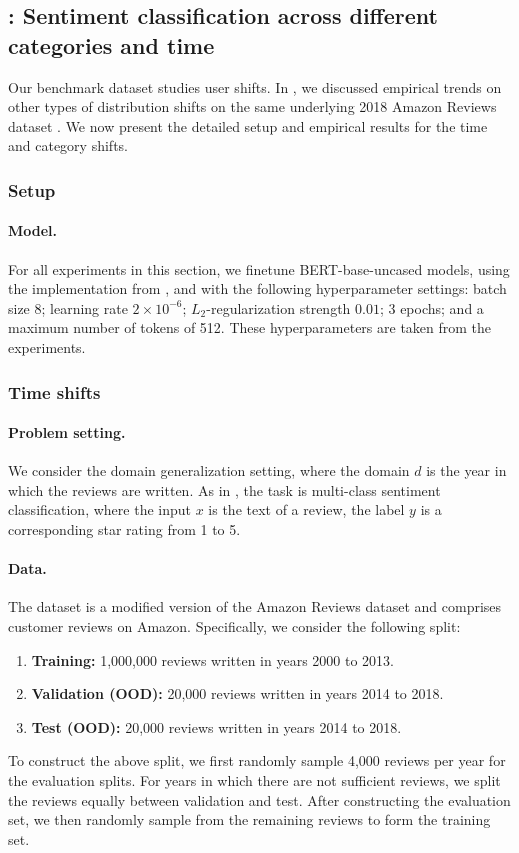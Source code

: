 \subsection{\AmazonName{}: Sentiment classification across different categories and time}\label{sec:app_amazon_other}

Our benchmark dataset \Amazon studies user shifts.
In , we discussed empirical trends on other types of distribution shifts on the same underlying 2018 Amazon Reviews dataset \citep{ni2019justifying}.
We now present the detailed setup and empirical results for the time and category shifts.

\subsubsection{Setup}
\paragraph{Model.}
For all experiments in this section, we finetune BERT-base-uncased models, using the implementation from \citet{wolf2019transformers}, and with the following hyperparameter settings:
batch size 8; learning rate $2 \times 10^{-6}$; $L_2$-regularization strength $0.01$; 3 epochs; and a maximum number of tokens of 512.
These hyperparameters are taken from the \Amazon experiments.


\subsubsection{Time shifts}
\paragraph{Problem setting.}
We consider the domain generalization setting, where the domain $d$ is the year in which the reviews are written.
As in \Amazon, the task is multi-class sentiment classification, where
the input $x$ is the text of a review, the label $y$ is a corresponding star rating from 1 to 5.

\paragraph{Data.}
The dataset is a modified version of the Amazon Reviews dataset \citep{ni2019justifying} and comprises customer reviews on Amazon.
Specifically, we consider the following split:
\begin{enumerate}
  \item \textbf{Training:} 1,000,000 reviews written in years 2000 to 2013.
  \item \textbf{Validation (OOD):} 20,000 reviews written in years 2014 to 2018.
  \item \textbf{Test (OOD):} 20,000 reviews written in years 2014 to 2018.
\end{enumerate}
To construct the above split, we first randomly sample 4,000 reviews per year for the evaluation splits. For years in which there are not sufficient reviews, we split the reviews equally between validation and test. After constructing the evaluation set, we then randomly sample from the remaining reviews to form the training set.

